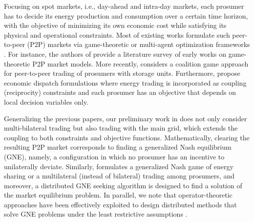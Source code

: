 \documentclass{IEEEtran}  %
\newcommand{\0}{\mathbf{0}}
\newcommand{\1}{\mathbf{1}}
\begin{document}
Focusing on spot markets, i.e., day-ahead and intra-day markets, each prosumer has to decide its energy production and consumption over a certain time horizon, with the objective of minimizing its own economic cost while satisfying its physical and operational constraints. 
Most of existing works formulate such peer-to-peer (P2P) markets via game-theoretic or multi-agent optimization frameworks \cite{tushar2018,tushar2020,lecadre2020,cui2020,zhang2020,baroche2019,sorin2019}. For instance, the authors of \cite{tushar2018} provide a literature survey of early works on game-theoretic P2P market models. {More recently, \cite{tushar2020} considers a coalition game approach for peer-to-peer trading of prosumers with storage units.}  Furthermore, \cite{lecadre2020,cui2020,zhang2020,baroche2019,sorin2019} propose economic dispatch formulations where energy trading is incorporated as coupling (reciprocity) constraints and each prosumer has an objective that depends on local decision variables only. 

Generalizing the previous papers, our preliminary work in  \cite{belgioioso2020energy} does not only consider multi-bilateral trading  but also trading with the main grid, which extends the coupling to both constraints and objective functions. 
%
Mathematically, clearing the resulting P2P market corresponds to finding a generalized Nash equilibrium (GNE), namely, a configuration in which no prosumer has an incentive to unilaterally deviate. 
%
Similarly, \cite{wang2021} formulates a generalized Nash game of energy sharing or a multilateral (instead of bilateral) trading among prosumers, and moreover, a distributed GNE seeking algorithm is designed to find a solution of the market equilibrium problem. 
%
In parallel, we note that operator-theoretic approaches have been effectively exploited to design distributed methods that solve GNE problems under the least restrictive assumptions \cite{paccagnan2019,belgioioso2020b,gadjov2020single,belgioioso2020semi,
	bianchi2020fast}.
\end{document}
